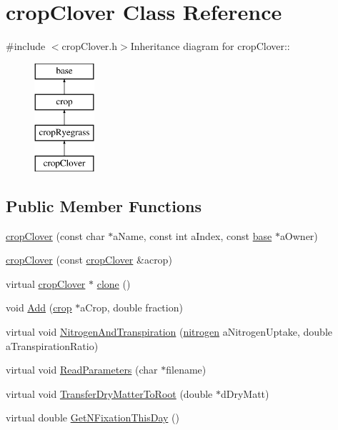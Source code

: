 \hypertarget{classcrop_clover}{
\section{cropClover Class Reference}
\label{classcrop_clover}
}


{\ttfamily \#include $<$cropClover.h$>$}Inheritance diagram for cropClover::\begin{figure}[H]
\begin{center}
\leavevmode
\includegraphics[height=4cm]{classcrop_clover}
\end{center}
\end{figure}
\subsection*{Public Member Functions}
\begin{DoxyCompactItemize}
\item 
\hyperlink{classcrop_clover_ae780963421392a4e2c5fb05a54c8fb29}{cropClover} (const char $\ast$aName, const int aIndex, const \hyperlink{classbase}{base} $\ast$aOwner)
\item 
\hyperlink{classcrop_clover_af45dd76dec2da31cb7910dfbc93965d2}{cropClover} (const \hyperlink{classcrop_clover}{cropClover} \&acrop)
\item 
virtual \hyperlink{classcrop_clover}{cropClover} $\ast$ \hyperlink{classcrop_clover_afe134102e033bd1326eb955327b4d902}{clone} ()
\item 
void \hyperlink{classcrop_clover_ab0d1a2a7eb7738bac0cb6456a95cf90c}{Add} (\hyperlink{classcrop}{crop} $\ast$aCrop, double fraction)
\item 
virtual void \hyperlink{classcrop_clover_a93d5dff1cdb5018b42f38cac6dc1de13}{NitrogenAndTranspiration} (\hyperlink{classnitrogen}{nitrogen} aNitrogenUptake, double aTranspirationRatio)
\item 
virtual void \hyperlink{classcrop_clover_a3a424244e4f17a802bbf8b52effdbd14}{ReadParameters} (char $\ast$filename)
\item 
virtual void \hyperlink{classcrop_clover_a1440530239e8b4754faefd889e56c83a}{TransferDryMatterToRoot} (double $\ast$dDryMatt)
\item 
virtual double \hyperlink{classcrop_clover_a59fd79a6a70369bb7bae83417641ddef}{GetNFixationThisDay} ()
\end{DoxyCompactItemize}
